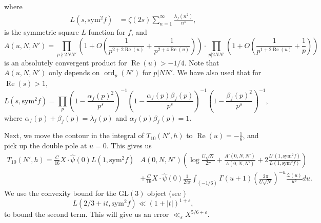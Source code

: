 \documentclass[12pt]{amsart}
\def\cZ{\mathcal Z}
\def\Re{\operatorname{Re}}
\def\log{\operatorname{log}}
\def\ord{\operatorname{ord}}
\begin{document}
where
\begin{align}\label{sym^2}
L(s,\text{sym}^2f)&=\zeta(2s)\sum_{n=1}^{\infty}\frac{\lambda_f(n^2)}{n^s},
\end{align}
is the symmetric square $L$-function for $f$, and
$$A(u,N,N')= \prod_{p\nmid 2NN'} \left( 1+ O\left( \frac{1}{p^{2+2\Re(u)}} + \frac{1}{p^{2+4\Re(u)}}\right) \right) \cdot \prod_{p|2NN'} \left( 1 + O\left( \frac{1}{p^{1+2\Re(u)}} + \frac{1}{p}\right) \right) $$ is an absolutely convergent product for $\Re(u) > -1/4$. Note that $A(u,N, N')$ only depends on $\ord_p(N')$ for $p|NN'$. We have also used that for $\Re(s)>1$,
\[L(s,\text{sym}^2f)=\prod_p\left(1-\frac{\alpha_f(p)^2}{p^s}\right)^{-1}\left(1-\frac{\alpha_f(p)\beta_f(p)}{p^s}\right)^{-1}\left(1-\frac{\beta_f(p)^2}{p^s}\right)^{-1},\]
where $\alpha_f(p)+\beta_f(p)=\lambda_f(p)$ and $\alpha_f(p)\beta_f(p)=1$.


Next, we move the contour in the integral of $T_{10}(N',h)$ to $\Re(u)=-\frac{1}{6}$, and pick up the double pole at $u=0$. This gives us
\begin{align*}
T_{10}(N',h) =  \frac{C}{16} X \cdot \hat{\psi}(0) L(1, \text{sym}^2 f) &A(0,N, N') \left( \log\frac{U\sqrt{N}}{2\pi} + \frac{A'(0,N, N')}{A(0,N, N')} + 2 \frac{L'(1,\text{sym}^2 f)}{L(1,\text{sym}^2 f)} \right) \\
&+ \frac{C}{16} X \cdot \hat{\psi}(0) \frac{1}{2i\pi} \int_{(-1/6)}\Gamma(u+1)\left(\frac{2\pi}{U\sqrt{N}}\right)^{-u} \frac{\cZ(u)}{u^2} du . 
\end{align*}
We use the convexity bound for the $\text{GL}(3)$ object (see \cite[Eqn (5.20)]{Iwk})
$$L(2/3 +it, \text{sym}^2f)  \ll (1+|t|)^{1+\varepsilon},$$ 
to bound the second term. This will give us an error $\ll_{\varepsilon} X^{5/6+\varepsilon}$.
\end{document}
